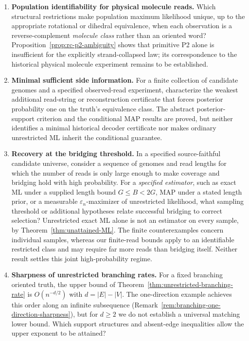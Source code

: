 \begin{enumerate}[label=\textbf{Q\arabic*.},leftmargin=*,itemsep=5pt,topsep=4pt]
\item \textbf{Population identifiability for physical molecule reads.}
Which structural restrictions make population maximum likelihood
unique, up to the appropriate rotational or dihedral equivalence,
when each observation is a reverse-complement \emph{molecule class}
rather than an oriented word?  Proposition~\ref{prop:rc-p2-ambiguity}
shows that primitive P2 alone is insufficient for the explicitly
strand-collapsed law; its correspondence to the historical
physical molecule experiment remains to be established.

\item \textbf{Minimal sufficient side information.}
For a finite collection of candidate genomes and a specified
observed-read experiment, characterize the weakest additional
read-string or reconstruction certificate that forces posterior
probability one on the truth's equivalence class.  The abstract
posterior-support criterion and the conditional MAP results are
proved, but neither identifies a minimal historical decoder
certificate nor makes ordinary unrestricted ML inherit the
conditional guarantee.
\item \textbf{Recovery at the bridging threshold.}
In a specified source-faithful candidate universe, consider a sequence
of genomes and read lengths for which the number of reads is only large
enough to make coverage and bridging hold with high probability. For a \emph{specified estimator}, such as
exact ML under a supplied length bound $G\le B<2G$,
MAP under a stated length prior, or a measurable
$\varepsilon_n$-maximizer of unrestricted likelihood,
what sampling threshold or additional hypotheses
relate successful bridging to correct selection?
Unrestricted exact ML alone is not an estimator
on every sample, by Theorem~\ref{thm:unattained-ML}. The finite counterexamples concern individual
samples, whereas our finite-read bounds apply to an identifiable
restricted class and may require far more reads than bridging itself.
Neither result settles this joint high-probability regime.

\item \textbf{Sharpness of unrestricted branching rates.}
For a fixed branching oriented truth, the upper bound of
Theorem~\ref{thm:unrestricted-branching-rate} is
$O(n^{-d/2})$ with $d=|E|-|V|$. The one-direction example
achieves this order along an infinite subsequence
(Remark~\ref{rem:branching-one-direction-sharpness}), but
for $d\ge2$ we do not establish a universal matching lower
bound. Which support structures and absent-edge inequalities
allow the upper exponent to be attained?
\end{enumerate}

